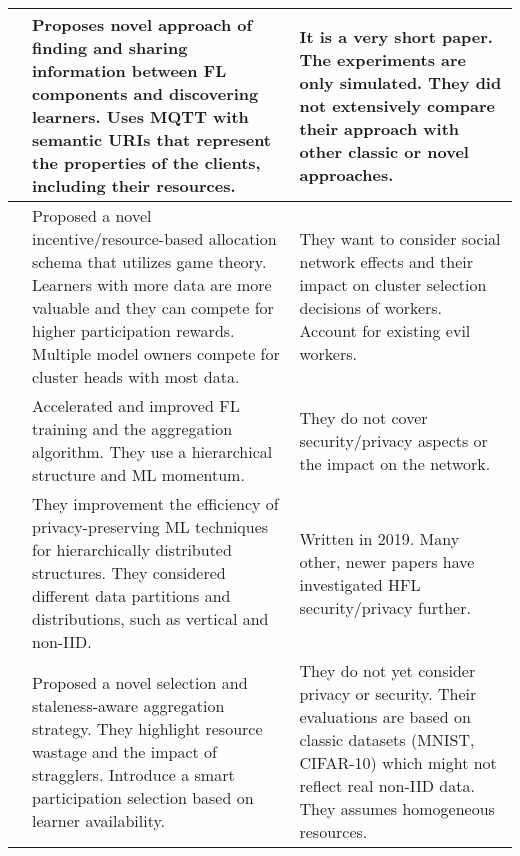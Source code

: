 \begin{changemargin}{-2cm}{0cm}
\begin{tabular}{|c||m{0.4\paperwidth}|m{0.4\paperwidth}|}
            &
            Proposes novel approach of finding and sharing information between FL components and discovering learners.
            Uses MQTT with semantic URIs that represent the properties of the clients, including their resources.
            &
            It is a very short paper.
            The experiments are only simulated.
            They did not extensively compare their approach with other classic or novel approaches.
        \\
        \hline
            \cite{paper:decentralized_edge_intelligence_dynamic_resource_allocation_framework_hfl}
            &
            Proposed a novel incentive/resource-based allocation schema that utilizes game theory.
            Learners with more data are more valuable and they can compete for higher participation rewards.
            Multiple model owners compete for cluster heads with most data.
            &
            They want to consider social network effects and their impact on cluster selection decisions of workers.
            Account for existing evil workers.
        \\
        \hline
            \cite{paper:hfl_with_momentum_acceleration_in_multi_tier_networks}
            &
            Accelerated and improved FL training and the aggregation algorithm.
            They use a hierarchical structure and ML momentum.
            &
            They do not cover security/privacy aspects or the impact on the network.
        \\
        \hline
            \cite{paper:efficient_privacy_preserving_ml_in_hierarchical_distributed_systems}
            &
            They improvement the efficiency of privacy-preserving ML techniques for hierarchically distributed structures.
            They considered different data partitions and distributions, such as vertical and non-IID.
            &
            Written in 2019.
            Many other, newer papers have investigated HFL security/privacy further.
        \\
        \hline
            \cite{paper:refl_resource_efficient_fl}
            &
            Proposed a novel selection and staleness-aware aggregation strategy.
            They highlight resource wastage and the impact of stragglers.
            Introduce a smart participation selection based on learner availability.
            &
            They do not yet consider privacy or security.
            Their evaluations are based on classic datasets (MNIST, CIFAR-10) which might not reflect real non-IID data.
            They assumes homogeneous resources.

\end{tabular}
\end{changemargin}
